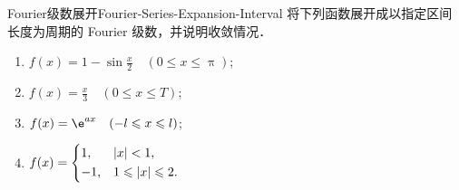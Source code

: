 \begin{problem}{Fourier级数展开}{Fourier-Series-Expansion-Interval}
    将下列函数展开成以指定区间长度为周期的 Fourier 级数，并说明收敛情况．
    \begin{enumerate}
        \item $f(x) = 1 - \sin \frac{x}{2} \quad (0 \leqslant x \leqslant \uppi)$;
        \item $f(x) = \frac{x}{3} \quad (0 \leqslant x \leqslant T)$;
        \item $f(x) = \e^{ax} \quad (-l \leqslant x \leqslant l)$;
        \item $f(x) = \begin{dcases} 1, & |x| < 1, \\ -1, & 1 \leqslant |x| \leqslant 2. \end{dcases}$
    \end{enumerate}
\end{problem}

